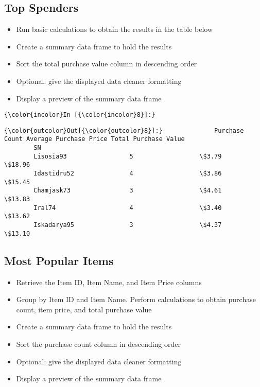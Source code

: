 \documentclass[11pt]{article}
\begin{document}
    \hypertarget{top-spenders}{%
\subsection{Top Spenders}\label{top-spenders}}

    \begin{itemize}
\item
  Run basic calculations to obtain the results in the table below
\item
  Create a summary data frame to hold the results
\item
  Sort the total purchase value column in descending order
\item
  Optional: give the displayed data cleaner formatting
\item
  Display a preview of the summary data frame
\end{itemize}

    \begin{Verbatim}[commandchars=\\\{\}]
{\color{incolor}In [{\color{incolor}8}]:} 
\end{Verbatim}


\begin{Verbatim}[commandchars=\\\{\}]
{\color{outcolor}Out[{\color{outcolor}8}]:}              Purchase Count Average Purchase Price Total Purchase Value
        SN                                                                     
        Lisosia93                 5                  \$3.79               \$18.96
        Idastidru52               4                  \$3.86               \$15.45
        Chamjask73                3                  \$4.61               \$13.83
        Iral74                    4                  \$3.40               \$13.62
        Iskadarya95               3                  \$4.37               \$13.10
\end{Verbatim}
            
    \hypertarget{most-popular-items}{%
\subsection{Most Popular Items}\label{most-popular-items}}

    \begin{itemize}
\item
  Retrieve the Item ID, Item Name, and Item Price columns
\item
  Group by Item ID and Item Name. Perform calculations to obtain
  purchase count, item price, and total purchase value
\item
  Create a summary data frame to hold the results
\item
  Sort the purchase count column in descending order
\item
  Optional: give the displayed data cleaner formatting
\item
  Display a preview of the summary data frame
\end{itemize}
\end{document}
